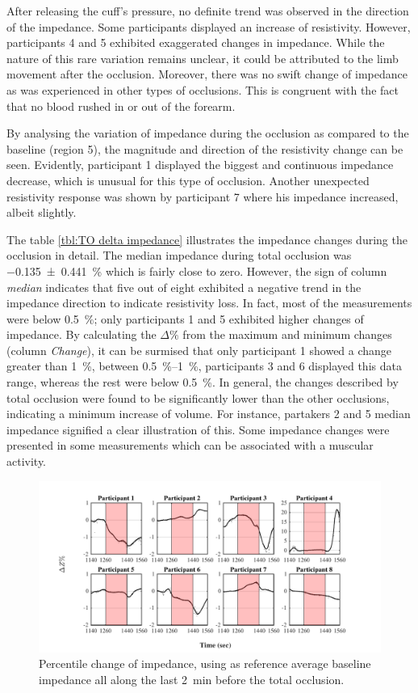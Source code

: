 After releasing the cuff's pressure, no definite trend was observed in the direction of the impedance. Some participants displayed an increase of resistivity. However, participants 4 and 5 exhibited exaggerated changes in impedance. While the nature of this rare variation remains unclear, it could be attributed to the limb movement after the occlusion. Moreover, there was no swift change of impedance as was experienced in other types of occlusions. This is congruent with the fact that no blood rushed in or out of the forearm.

By analysing the variation of impedance during the occlusion as compared to the baseline (region 5), the magnitude and direction of the resistivity change can be seen. Evidently, participant 1 displayed the biggest and continuous impedance decrease, which is unusual for this type of occlusion. Another unexpected resistivity response was shown by participant 7 where his impedance increased, albeit slightly.  

The table \ref{tbl:TO delta impedance} illustrates the impedance changes during the occlusion in detail. The median impedance during total occlusion was \SI{-0.135(0441)}{\percent} which is fairly close to zero. However, the sign of column \textit{median} indicates that five out of eight exhibited a negative trend in the impedance direction to indicate resistivity loss. In fact, most of the measurements were below \SI{0.5}{\percent}; only participants 1 and 5 exhibited higher changes of impedance. By calculating the $\Delta \%$ from the maximum and minimum changes (column \textit{Change}), it can be surmised that only participant 1 showed a change greater than \SI{1}{\percent}, between \SIrange{0.5}{1}{\percent}, participants 3 and 6 displayed this data range, whereas the rest were below \SI{0.5}{\percent}. In general, the changes described by total occlusion were found to be significantly lower than the other occlusions, indicating a minimum increase of volume. For instance, partakers 2 and 5 median impedance signified a clear illustration of this. Some impedance changes were presented in some measurements which can be associated with a muscular activity. 

\begin{figure}[htbp]
	\centering
	\includegraphics[width=15cm,keepaspectratio]{figure_vop_8}    
	\caption [Percentile variation of impedance during total occlusion]{Percentile change of impedance, using as reference average baseline impedance all along the last \SI{2}{\minute} before the total occlusion.}
	\label{fig:total occlusion imepdance}
\end{figure} 

